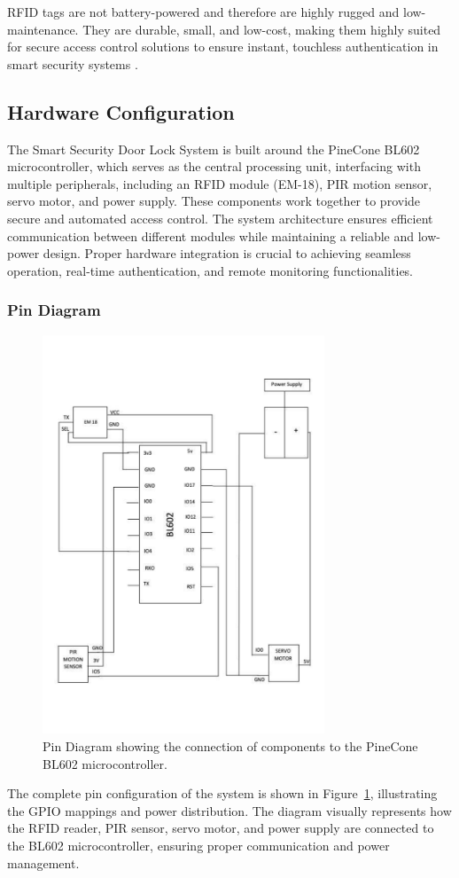 \documentclass[a4paper]{scrartcl}
\begin{document}
RFID tags are not battery-powered and therefore are highly rugged and low-maintenance. They are durable, small, and low-cost, making them highly suited for secure access control solutions to ensure instant, touchless authentication in smart security systems \cite{RFIDInc2025}.



\subsection{Hardware Configuration}
The Smart Security Door Lock System is built around the PineCone BL602 microcontroller, which serves as the central processing unit, interfacing with multiple peripherals, including an RFID module (EM-18), PIR motion sensor, servo motor, and power supply. These components work together to provide secure and automated access control. The system architecture ensures efficient communication between different modules while maintaining a reliable and low-power design. Proper hardware integration is crucial to achieving seamless operation, real-time authentication, and remote monitoring functionalities.
 
 \subsubsection{Pin Diagram} 
 \begin{figure}[H]
    \centering
    \includegraphics[width=0.75\textwidth]{pin.pdf}
    \caption{Pin Diagram showing the connection of components to the PineCone BL602 microcontroller.}
    \label{fig:pin}
\end{figure}
The complete pin configuration of the system is shown in Figure~\ref{fig:pin}, illustrating the GPIO mappings and power distribution. The diagram visually represents how the RFID reader, PIR sensor, servo motor, and power supply are connected to the BL602 microcontroller, ensuring proper communication and power management.
\end{document}
